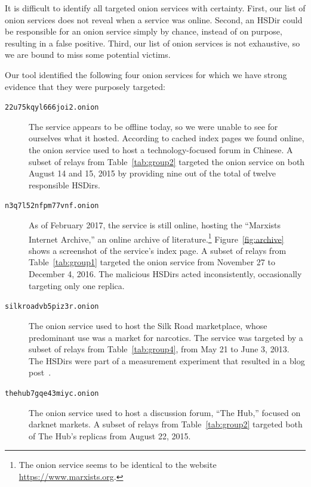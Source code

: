 It is difficult to identify all targeted onion services with certainty.  First,
our list of onion services does not reveal when a service was online.  Second,
an HSDir could be responsible for an onion service simply by chance, instead of
on purpose, resulting in a false positive.  Third, our list of onion services is
not exhaustive, so we are bound to miss some potential victims.

Our tool identified the following four onion services for which we have strong
evidence that they were purposely targeted:

\begin{description}
	\item[\texttt{22u75kqyl666joi2.onion}] The service appears to be offline
		today, so we were unable to see for ourselves what it hosted.  According
		to cached index pages we found online, the onion service used to host a
		technology-focused forum in Chinese.  A subset of relays from
		Table~\ref{tab:group2} targeted the onion service on both August 14 and
		15, 2015 by providing nine out of the total of twelve responsible
		HSDirs.

	\item[\texttt{n3q7l52nfpm77vnf.onion}] As of February 2017, the service is
		still online, hosting the ``Marxists Internet Archive,'' an online
		archive of literature.\footnote{The onion service seems to be identical
		to the website \url{https://www.marxists.org}.} Figure~\ref{fig:archive}
		shows a screenshot of the service's index page.  A subset of relays from
		Table~\ref{tab:group1} targeted the onion service from November 27 to
		December 4, 2016.  The malicious HSDirs acted inconsistently,
		occasionally targeting only one replica.

	\item[\texttt{silkroadvb5piz3r.onion}] The onion service used to host the
		Silk Road marketplace, whose predominant use was a market for narcotics.
		The service was targeted by a subset of relays from
		Table~\ref{tab:group4}, from May 21 to June 3, 2013.  The HSDirs were
		part of a measurement experiment that resulted in a blog
		post~\cite{OCearbhaill2013a}.

	\item[\texttt{thehub7gqe43miyc.onion}] The onion service used to host a
		discussion forum, ``The Hub,'' focused on darknet markets.  A subset of
		relays from Table~\ref{tab:group2} targeted both of The Hub's replicas
		from August 22, 2015.
\end{description}

